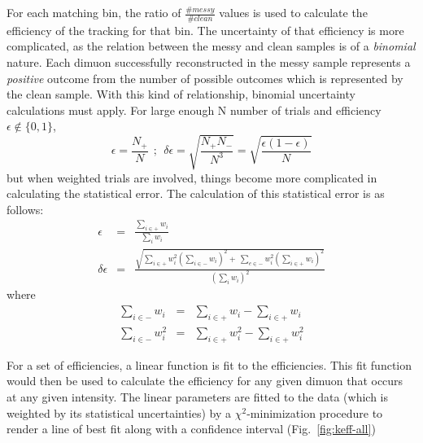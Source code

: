For each matching bin, the ratio of $\frac{\#messy}{\#clean}$ values is used to calculate the efficiency of the tracking for that bin. The uncertainty of that efficiency is more complicated, as the relation between the messy and clean samples is of a \emph{binomial} nature. Each dimuon successfully reconstructed in the messy sample represents a \emph{positive} outcome from the number of possible outcomes which is represented by the clean sample. With this kind of relationship, binomial uncertainty calculations must apply. For large enough N number of trials and efficiency $\epsilon\notin \{0,1\}$,
\begin{equation}
\epsilon = \frac{N_+}{N}\ \ ;\ \ \delta\epsilon = \sqrt{\frac{N_+ N_-}{N^3}} = \sqrt{\frac{\epsilon(1-\epsilon)}{N}}
\label{eq:binomial-naive}
\end{equation}
but when weighted trials are involved, things become more complicated in calculating the statistical error. The calculation of this statistical error\cite{blist:binomial} is as follows:
\begin{eqnarray}
	\epsilon & = & \frac{\sum\limits_{i\in+}w_i}{\sum\limits_i w_i} \\
	\delta\epsilon & = & \frac{\sqrt{\sum\limits_{i\in+} w_i^2 \left(\sum\limits_{i\in-} w_i \right)^2 + \
			\sum\limits_{e\in-} w_i^2 \left(\sum\limits_{i\in+} w_i \right)^2}} {\left(\sum\limits_{i}w_i\right)^2}
	\label{eq:binomial-weighted}
\end{eqnarray}
where
\begin{eqnarray}
\sum\limits_{i\in-} w_i & = & \sum\limits_{i\in+}w_i - \sum\limits_{i\in+}w_i \\
\sum\limits_{i\in-} w_i^2 & = & \sum\limits_{i\in+}w_i^2 - \sum\limits_{i\in+}w_i^2 
\end{eqnarray}

For a set of efficiencies, a linear function is fit to the efficiencies. This fit function would then be used to calculate the efficiency for any given dimuon that occurs at any given intensity. The linear parameters are fitted to the data (which is weighted by its statistical uncertainties) by a $\chi^2$-minimization procedure to render a line of best fit along with a confidence interval (Fig.~\ref{fig:keff-all})

